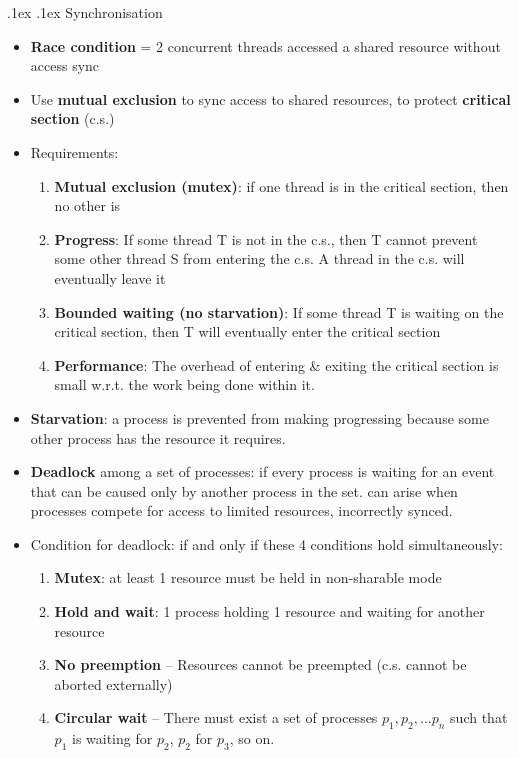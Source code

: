 \documentclass[10pt,landscape,a4paper]{article}
\makeatletter
\renewcommand{\subsection}{\@startsection{subsection}{1}{0mm}%
  {.1ex}%
  {.1ex}%
{\sffamily\bfseries}}
\makeatother
\begin{document}
\begin{multicols*}{4}
  \subsection{Synchronisation}
  \begin{itemize}
    \item \textbf{Race condition} = 2 concurrent threads accessed a shared resource without access sync
    \item Use \textbf{mutual exclusion} to sync access to shared resources, to protect \textbf{critical section} (c.s.)
    \item Requirements:
          \begin{enumerate}
            \item \textbf{Mutual exclusion (mutex)}: if one thread is in the critical section, then no other is
            \item \textbf{Progress}: If some thread T is not in the c.s., then T cannot prevent some other thread S from entering the c.s. A thread in the c.s. will eventually leave it
            \item \textbf{Bounded waiting (no starvation)}: If some thread T is waiting on the critical section, then T will eventually enter the critical section
            \item \textbf{Performance}: The overhead of entering \& exiting the critical section is small w.r.t. the work being done within it.
          \end{enumerate}
    \item \textbf{Starvation}: a process is prevented from making progressing because some other process has the resource it requires.
    \item \textbf{Deadlock} among a set of processes: if every process is waiting for an event that can be caused only by another process in the set. can arise when processes compete for access to limited resources, incorrectly synced.
    \item Condition for deadlock: if and only if these 4 conditions hold simultaneously:
          \begin{enumerate}
            \item \textbf{Mutex}: at least 1 resource must be held in non-sharable mode
            \item \textbf{Hold and wait}: 1 process holding 1 resource and waiting for another resource
            \item \textbf{No preemption} -- Resources cannot be preempted (c.s. cannot be aborted externally)
            \item \textbf{Circular wait} -- There must exist a set of processes $p_1, p_2, ... p_n$ such that $p_1$ is waiting for $p_2$, $p_2$ for $p_3$, so on.

\end{enumerate}
\end{itemize}
\end{multicols*}
\end{document}
